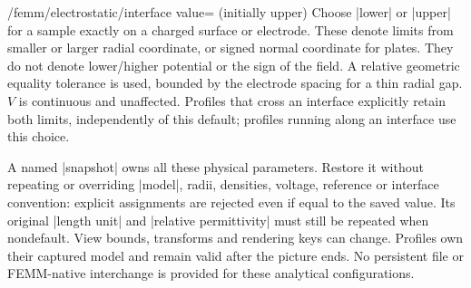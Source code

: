 \begin{key}{/femm/electrostatic/interface value= (initially upper)}
Choose |lower| or |upper| for a sample exactly on a charged surface or electrode.
These denote limits from smaller or larger radial coordinate, or signed normal
coordinate for plates. They do not denote lower/higher potential or the sign
of the field. A relative geometric equality tolerance is used, bounded by the
electrode spacing for a thin radial gap. $V$ is continuous and unaffected.
Profiles that cross an interface explicitly retain both limits, independently
of this default; profiles running along an interface use this choice.
\end{key}

\begin{codeexample}[width=0pt]
\end{codeexample}

A named |snapshot| owns all these physical parameters. Restore it without
repeating or overriding |model|, radii, densities, voltage, reference or
interface convention: explicit assignments are rejected even if equal to the
saved value. Its original |length unit| and |relative permittivity| must still
be repeated when nondefault. View bounds, transforms and rendering keys can
change. Profiles own their captured model and remain valid after the picture
ends. No persistent file or FEMM-native interchange is provided for these
analytical configurations.

